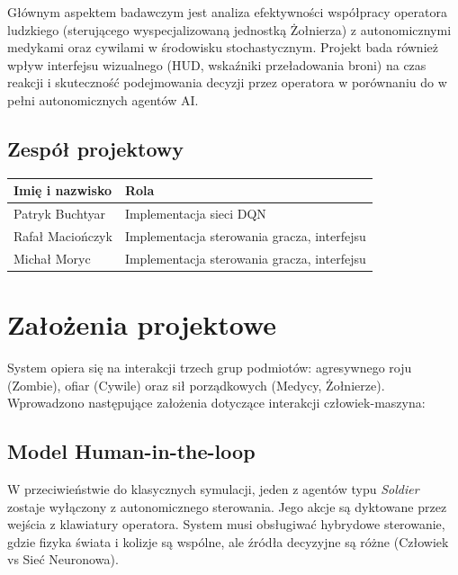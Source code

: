 \documentclass[12pt,a4paper]{article}
\begin{document}
Głównym aspektem badawczym jest analiza efektywności współpracy operatora
ludzkiego (sterującego wyspecjalizowaną jednostką Żołnierza) z autonomicznymi
medykami oraz cywilami w środowisku stochastycznym. Projekt bada również wpływ
interfejsu wizualnego (HUD, wskaźniki przeładowania broni) na czas reakcji i
skuteczność podejmowania decyzji przez operatora w porównaniu do w pełni
autonomicznych agentów AI.

\subsection{Zespół projektowy}
\begin{table}[h]
    \centering
    \begin{tabular}{|l|l|}
        \hline
        \textbf{Imię i nazwisko} & \textbf{Rola}                               \\ \hline
        Patryk Buchtyar          & Implementacja sieci DQN                     \\ \hline
        Rafał Maciończyk         & Implementacja sterowania gracza, interfejsu \\ \hline
        Michał Moryc             & Implementacja sterowania gracza, interfejsu \\ \hline
    \end{tabular}
\end{table}

\newpage

\section{Założenia projektowe}

System opiera się na interakcji trzech grup podmiotów: agresywnego roju
(Zombie), ofiar (Cywile) oraz sił porządkowych (Medycy, Żołnierze). Wprowadzono
następujące założenia dotyczące interakcji człowiek-maszyna:

\subsection{Model Human-in-the-loop}
W przeciwieństwie do klasycznych symulacji, jeden z agentów typu
\textit{Soldier} zostaje wyłączony z autonomicznego sterowania. Jego akcje są
dyktowane przez wejścia z klawiatury operatora. System musi obsługiwać
hybrydowe sterowanie, gdzie fizyka świata i kolizje są wspólne, ale źródła
decyzyjne są różne (Człowiek vs Sieć Neuronowa).
\end{document}
